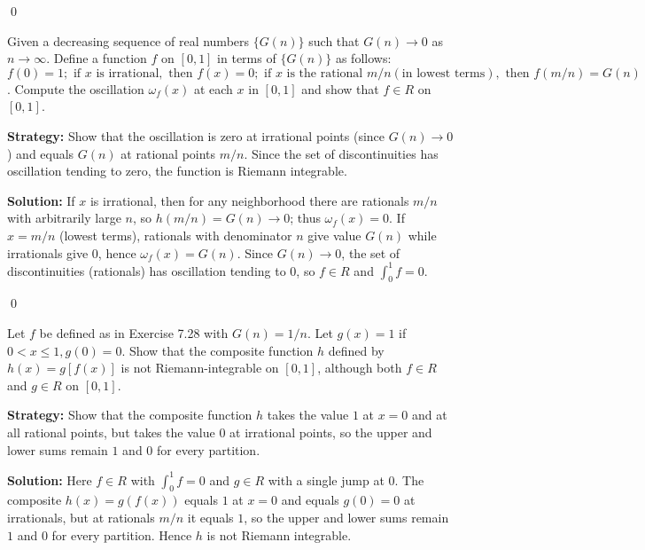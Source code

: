 \qed
\begin{problembox}
Given a decreasing sequence of real numbers $\{G(n)\}$ such that $G(n) \to 0$ as $n \to \infty$. Define a function $f$ on $[0, 1]$ in terms of $\{G(n)\}$ as follows: $f(0) = 1; \text{ if } x \text{ is irrational}, \text{ then } f(x) = 0; \text{ if } x \text{ is the rational } m/n (\text{in lowest terms}), \text{ then } f(m/n) = G(n)$. Compute the oscillation $\omega_f(x)$ at each $x$ in $[0, 1]$ and show that $f \in R$ on $[0, 1]$.
\end{problembox}

\noindent\textbf{Strategy:} Show that the oscillation is zero at irrational points (since $G(n) \to 0$) and equals $G(n)$ at rational points $m/n$. Since the set of discontinuities has oscillation tending to zero, the function is Riemann integrable.

\bigskip\noindent\textbf{Solution:}
If $x$ is irrational, then for any neighborhood there are rationals $m/n$ with arbitrarily large $n$, so $h(m/n)=G(n)\to 0$; thus $\omega_f(x)=0$. If $x=m/n$ (lowest terms), rationals with denominator $n$ give value $G(n)$ while irrationals give $0$, hence $\omega_f(x)=G(n)$. Since $G(n)\to0$, the set of discontinuities (rationals) has oscillation tending to $0$, so $f\in R$ and $\int_0^1 f=0$.




\qed
\begin{problembox}
Let $f$ be defined as in Exercise 7.28 with $G(n) = 1/n$. Let $g(x) = 1$ if $0 < x \leq 1, g(0) = 0$. Show that the composite function $h$ defined by $h(x) = g[f(x)]$ is not Riemann-integrable on $[0, 1]$, although both $f \in R$ and $g \in R$ on $[0, 1]$.
\end{problembox}

\noindent\textbf{Strategy:} Show that the composite function $h$ takes the value $1$ at $x = 0$ and at all rational points, but takes the value $0$ at irrational points, so the upper and lower sums remain $1$ and $0$ for every partition.

\bigskip\noindent\textbf{Solution:}
Here $f\in R$ with $\int_0^1 f=0$ and $g\in R$ with a single jump at $0$. The composite $h(x)=g(f(x))$ equals $1$ at $x=0$ and equals $g(0)=0$ at irrationals, but at rationals $m/n$ it equals $1$, so the upper and lower sums remain $1$ and $0$ for every partition. Hence $h$ is not Riemann integrable.




